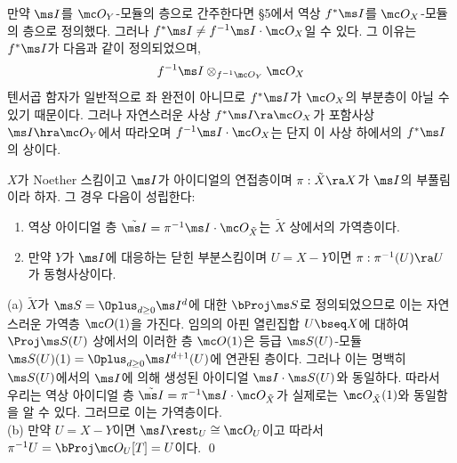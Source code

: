 	
	\begin{caution}
	만약 $\ms I$를 $\mc O_Y$-모듈의 층으로 간주한다면 \S 5에서 역상 $f^*\ms I$를 $\mc O_X$-모듈의 층으로 정의했다.
	그러나 $f^*\ms I\ne f^{-1}\ms I\cdot\mc O_X$일 수 있다. 그 이유는 $f^*\ms I$가 다음과 같이 정의되었으며,
	$$f^{-1}\ms I\otimes_{f^{-1}\mc O_Y}\mc O_X$$
	텐서곱 함자가 일반적으로 좌 완전이 아니므로 $f^*\ms I$가 $\mc O_X$의 부분층이 아닐 수 있기 때문이다.
	그러나 자연스러운 사상 $f^*\ms I\ra\mc O_X$가 포함사상 $\ms I\hra\mc O_Y$에서 따라오며
	$f^{-1}\ms I\cdot\mc O_X$는 단지 이 사상 하에서의 $f^*\ms I$의 상이다.
	\end{caution}
	
	
	\begin{proposition}
	$X$가 Noether 스킴이고 $\ms I$가 아이디얼의 연접층이며 $\pi:\tilde X\ra X$가 $\ms I$의 부풀림이라 하자. 그 경우 다음이 성립한다:
	\begin{enumerate}[label=(\alph*)]
	\item 역상 아이디얼 층 $\tilde{\ms I}=\pi^{-1}\ms I\cdot\mc O_{\tilde X}$는 $\tilde X$ 상에서의 가역층이다.
	\item 만약 $Y$가 $\ms I$에 대응하는 닫힌 부분스킴이며 $U=X-Y$이면 $\pi:\pi^{-1}(U)\ra U$가 동형사상이다.\\
	\end{enumerate}
	\pf (a) $\tilde X$가 $\ms S=\Oplus_{d\ge 0}\ms I^d$에 대한 $\bProj\ms S$로 정의되었으므로
	이는 자연스러운 가역층 $\mc O(1)$을 가진다.
	임의의 아핀 열린집합 $U\bseq X$에 대하여 $\Proj\ms S(U)$ 상에서의 이러한 층 $\mc O(1)$은
	등급 $\ms S(U)$-모듈 $\ms S(U)(1)=\Oplus_{d\ge 0}\ms I^{d+1}(U)$에 연관된 층이다.
	그러나 이는 명백히 $\ms S(U)$에서의 $\ms I$에 의해 생성된 아이디얼 $\ms I\cdot\ms S(U)$와 동일하다.
	따라서 우리는 역상 아이디얼 층 $\tilde{\ms I}=\pi^{-1}\ms I\cdot\mc O_{\tilde X}$가
	실제로는 $\mc O_{\tilde X}(1)$와 동일함을 알 수 있다. 그러므로 이는 가역층이다.\\
	(b) 만약 $U=X-Y$이면 $\ms I\rest_U\cong\mc O_U$이고 따라서 $\pi^{-1}U=\bProj\mc O_U[T]=U$이다.
	\qed
	\end{proposition}
	

